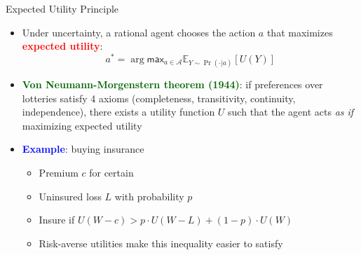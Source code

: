 \documentclass[
  10pt,
  ignorenonframetext,
]{beamer}
\providecommand{\tightlist}{%
  \setlength{\itemsep}{0pt}\setlength{\parskip}{0pt}}
\newcommand{\EE}{\mathbb{E}}
\def\max{\textsf{max}}
\begin{document}
\begin{frame}{Expected Utility Principle}
\label{expected-utility-principle}
\begin{itemize}
\item
  Under uncertainty, a rational agent chooses the action \(a\) that
  maximizes \textbf{\textcolor{red}{expected utility}}: \[
  a^* = \arg\max_{a \in \mathcal{A}} \EE_{Y \sim \Pr(\cdot | a)}[U(Y)]
  \]
\item
  \textbf{\textcolor{darkgreen}{Von Neumann-Morgenstern theorem (1944)}}:
  if preferences over lotteries satisfy 4 axioms (completeness,
  transitivity, continuity, independence), there exists a utility
  function \(U\) such that the agent acts \emph{as if} maximizing
  expected utility
\item
  \textbf{\textcolor{blue}{Example}}: buying insurance

  \begin{itemize}
  \tightlist
  \item
    Premium \(c\) for certain
  \item
    Uninsured loss \(L\) with probability \(p\)
  \item
    Insure if \(U(W - c) > p \cdot U(W - L) + (1 - p) \cdot U(W)\)
  \item
    Risk-averse utilities make this inequality easier to satisfy
  \end{itemize}
\end{itemize}
\end{frame}
\end{document}
